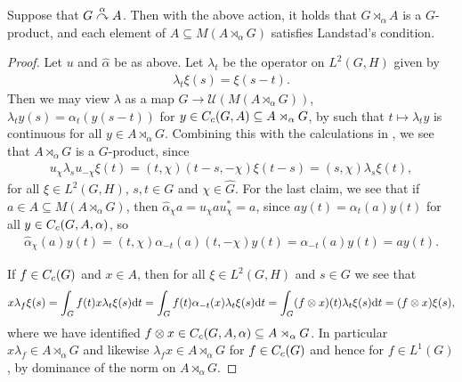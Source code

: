 \begin{lemma}
Suppose that $G \stackrel{\alpha}{\curvearrowright} A$. Then with the above action, it holds that $G \rtimes_\alpha A$ is a $G$-product, and each element of $A \subseteq M(A \rtimes_\alpha G)$ satisfies Landstad's condition.
\end{lemma}
\begin{proof}
Let $u$ and $\hat \alpha$ be as above. Let $\lambda_t$ be the operator on $L^2(G,H)$ given by
\begin{align*}
	\lambda_t \xi(s) = \xi(s-t).
\end{align*}
Then we may view $\lambda$ as a map $G \to \mathcal{U}(M(A \rtimes_\alpha G))$, $\lambda_t y(s) = \alpha_t (y(s-t))$ for $y \in C_c(G,A)\subseteq A \rtimes_\alpha G$, by  such that $t \mapsto \lambda_t y$ is continuous for all $y \in A \rtimes_\alpha G$. Combining this with the calculations in , we see that $A \rtimes_\alpha G$ is a $G$-product, since
\begin{align*}
	u_\chi \lambda_s u_{-\chi} \xi(t) = (t,\chi) (t-s, - \chi) \xi(t-s) = (s, \chi) \lambda_s \xi(t),
\end{align*}
for all $\xi \in L^2(G,H)$, $s,t \in G$ and $\chi  \in \hat G$. For the last claim, we see that if $a \in A \subseteq M(A \rtimes_\alpha G)$, then $\hat \alpha_\chi a = u_\chi a u_\chi^* = a$, since $a y(t) = \alpha_t(a) y(t)$ for all $y \in C_c(G,A,\alpha)$, so
\begin{align*}
	\hat \alpha_\chi (a)y(t) = (t, \chi) \alpha_{-t}(a) (t,-\chi) y(t) = \alpha_{-t}(a) y(t) = ay(t).
\end{align*}

If $f \in C_c(G)$ and $x \in A$, then for all $\xi \in L^2(G,H)$ and $s \in G$ we see that
\begin{align*}
	x \lambda_f \xi(s) = \int_G f(t) x \lambda_t \xi(s) \mathrm{d} t = \int_G f(t) \alpha_{-t}(x) \lambda_t \xi(s) \mathrm{d} t = \int_G (f \otimes x)(t) \lambda_t \xi(s) \mathrm{d} t = (f \otimes x )\xi(s),
\end{align*}
where we have identified $f \otimes x \in C_c(G,A,\alpha)\subseteq A \rtimes_\alpha G$. In particular $x \lambda_f \in A \rtimes_\alpha G$ and likewise $\lambda_f x \in A \rtimes_\alpha G$ for $f \in C_c(G)$ and hence for $f \in L^1(G)$, by dominance of the norm on $A \rtimes_\alpha G$.
\end{proof}

